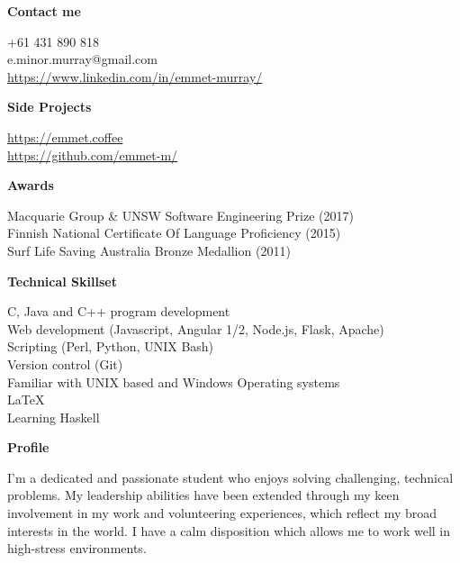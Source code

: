 \documentclass[a4paper]{article}
\newcommand{\mytitle}[1]{{\Large \textbf{#1}} \vspace{0.2cm}}
\begin{document}
\begin{minipage}[t]{0.3\linewidth}
    \vspace{0.2cm}
    {
        \mytitle{Contact me}
        
        +61 431 890 818 \\
        e.minor.murray@gmail.com \\
        \href{https://emmet.coffe://www.linkedin.com/in/emmet-murray/}{https://www.linkedin.com/in/emmet-murray/} \\

    }
    \vspace{0.2cm}
    {
        \mytitle{Side Projects}
        
        \href{https://emmet.coffee}{https://emmet.coffee} \\
        \href{https://github.com/emmet-m/}{https://github.com/emmet-m/} \\
        
    }
    \vspace{0.3cm}

    {
        \mytitle{Awards}

        Macquarie Group \& UNSW Software Engineering Prize (2017) \\

        Finnish National Certificate Of Language Proficiency (2015) \\

        Surf Life Saving Australia Bronze Medallion (2011)
    }
    \vspace{0.5cm}
    
    {
        \mytitle{Technical Skillset}

        C, Java and C++ program development \\ 

        Web development (Javascript, Angular 1/2, Node.js, Flask, Apache) \\

        Scripting (Perl, Python, UNIX Bash) \\

        Version control (Git) \\

        Familiar with UNIX based and Windows Operating systems \\

        {\large \LaTeX} \\
        
        Learning Haskell
    }

    \vspace{0.5cm}
    {
        \mytitle{Profile}
        
        I'm a dedicated and passionate student who enjoys solving challenging, technical problems.
        My leadership abilities have been extended through my keen involvement in my work and volunteering experiences, which reflect my broad interests in the world.
        I have a calm disposition which allows me to work well in high-stress environments. \\
    }

%
%
\end{minipage}
%
\end{document}
